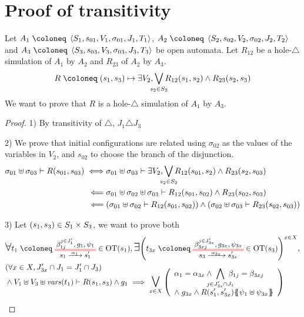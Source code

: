 \documentclass{article}
\begin{document}
\section{Proof of transitivity}\label{apx:trans}
Let \(A_1 \defobject \OAg[1]\), \(A_2 \defobject \OAg[2]\) and \(A_3 \defobject \OAg[3]\) be open automata.
Let \(R_{12}\) be a hole-\(\triangle\) simulation of \(A_1\) by \(A_2\) and \(R_{23}\) of \(A_2\) by \(A_3\).
\[ R \defobject \mpar{s_1, s_3} \mapsto \exists V_2, \bigvee_\subbox{s_2 \in S_2} R_{12}\mpar{s_1, s_2} \wedge R_{23}\mpar{s_2, s_3} \]
We want to prove that \(R\) is a hole-\(\triangle\) simulation of \(A_1\) by \(A_3\).
\begin{proof}
\item[1)] By transitivity of \(\triangle\), \(J_1 \triangle J_3\)
\item[2)] We prove that initial configurations are related using \(\sigma_{02}\) as the values of the variables in \(V_2\), and \(s_{02}\) to choose the branch of the disjunction.
\begin{align*}
	\sigma_{01} \uplus \sigma_{03} \vdash R\mpar{s_{01}, s_{03}} \iff & \sigma_{01} \uplus \sigma_{03} \vdash \exists V_2, \bigvee_\subbox{s_2 \in S_2} R_{12}\mpar{s_{01}, s_2} \wedge R_{23}\mpar{s_2, s_{03}} \\
	\impliedby & \sigma_{01} \uplus \sigma_{02} \uplus \sigma_{03} \vdash R_{12}\mpar{s_{01}, s_{02}} \wedge R_{23}\mpar{s_{02}, s_{03}} \\
	\impliedby & \mpar{\sigma_{01} \uplus \sigma_{02} \vdash R_{12}\mpar{s_{01}, s_{02}}} \wedge \mpar{\sigma_{02} \uplus \sigma_{03} \vdash R_{23}\mpar{s_{02}, s_{03}}}
\end{align*}
\item[3)] Let \({\left(s_1, s_3\right)} \in S_1 \times S_3\), we want to prove both
	\begin{align*}
		& \bigsymb{\forall} t_1 \defobject \OTx{1}{}{1}{1} \in \fOT{s_1}, \bigsymb{\exists} \mpar{t_{3x} \defobject \OTx{3}{x}{3x}{3x} \in \fOT{s_3}}^{x \in X}, \\
		& \mpar{\forall x \in X, J'_{3x} \cap J_1 = J'_1 \cap J_3} \\[-10pt]
		& \wedge V_1 \uplus V_3 \uplus \fvars{t_1} \vdash R\mpar{s_1, s_3} \wedge g_1 \implies \operatorname*{\bigsymb{\bigvee}}_{x \in X} \mpar{\everymath{\displaystyle}\begin{array}{l}
			\alpha_1 = \alpha_{3x} \wedge \bigwedge_\subbox{j \in J'_{3x} \cap J_1} \beta_{1j} = \beta_{3xj} \\[12pt]
			\nwedge g_{3x} \wedge R\mpar{s'_1, s'_{3x}}\psubst{\psi_1 \uplus \psi_{3x}}

\end{array}}
\end{align*}
\end{proof}
\end{document}
